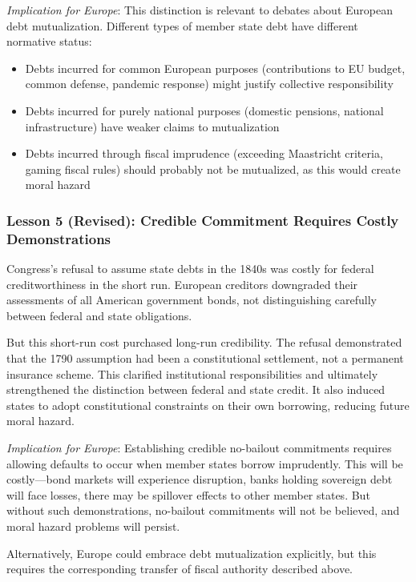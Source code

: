\documentclass[12pt]{article}
\begin{document}
\textit{Implication for Europe}: This distinction is relevant to debates about European debt mutualization. Different types of member state debt have different normative status:
\begin{itemize}
\item Debts incurred for common European purposes (contributions to EU budget, common defense, pandemic response) might justify collective responsibility
\item Debts incurred for purely national purposes (domestic pensions, national infrastructure) have weaker claims to mutualization
\item Debts incurred through fiscal imprudence (exceeding Maastricht criteria, gaming fiscal rules) should probably not be mutualized, as this would create moral hazard
\end{itemize}

\subsubsection{Lesson 5 (Revised): Credible Commitment Requires Costly Demonstrations}

Congress's refusal to assume state debts in the 1840s was costly for federal creditworthiness in the short run. European creditors downgraded their assessments of all American government bonds, not distinguishing carefully between federal and state obligations.

But this short-run cost purchased long-run credibility. The refusal demonstrated that the 1790 assumption had been a constitutional settlement, not a permanent insurance scheme. This clarified institutional responsibilities and ultimately strengthened the distinction between federal and state credit. It also induced states to adopt constitutional constraints on their own borrowing, reducing future moral hazard.

\textit{Implication for Europe}: Establishing credible no-bailout commitments requires allowing defaults to occur when member states borrow imprudently. This will be costly---bond markets will experience disruption, banks holding sovereign debt will face losses, there may be spillover effects to other member states. But without such demonstrations, no-bailout commitments will not be believed, and moral hazard problems will persist.

Alternatively, Europe could embrace debt mutualization explicitly, but this requires the corresponding transfer of fiscal authority described above.
\end{document}
